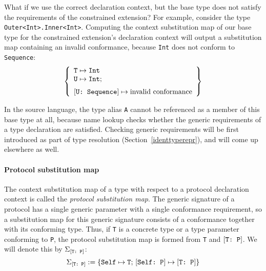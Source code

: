\documentclass[../generics]{subfiles}
\begin{document}
\begin{example} What if we use the correct declaration context, but the base type does not satisfy the requirements of the constrained extension? For example, consider the type \texttt{Outer<Int>.Inner<Int>}. Computing the context substitution map of our base type for the constrained extension's declaration context will output a substitution map containing an invalid conformance, because \texttt{Int} does not conform to \texttt{Sequence}:
\[
\SubstMapLongC{
\SubstType{T}{Int}\\
\SubstType{U}{Int}
}{
\ConfReq{U}{Sequence}\mapsto\text{invalid conformance}
}
\]
\end{example}
In the source language, the type alias \texttt{A} cannot be referenced as a member of this base type at all, because name lookup checks whether the generic requirements of a type declaration are satisfied. Checking generic requirements will be first introduced as part of type resolution (Section~\ref{identtyperepr}), and will come up elsewhere as well.


\paragraph{Protocol substitution map}
The context substitution map of a type with respect to a protocol declaration context is called the \emph{protocol substitution map}. The generic signature of a protocol has a single generic parameter with a single conformance requirement, so a substitution map for this generic signature consists of a conformance together with its conforming type. Thus, if \texttt{T} is a concrete type or a type parameter conforming to \texttt{P}, the protocol substitution map is formed from \texttt{T} and $[\texttt{T:~P}]$. We will denote this by $\Sigma_{[\texttt{T:~P}]}$:
\[
\Sigma_{[\texttt{T:~P}]} := \{
\texttt{Self} \mapsto \texttt{T}
;\,
[\texttt{Self:~P}] \mapsto [\texttt{T:~P}]
\}
\]
\end{document}

